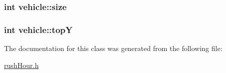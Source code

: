 \hypertarget{classvehicle_ab06480dfddc3c0b8696140fb5c649369}{
\subsubsection[{size}]{\setlength{\rightskip}{0pt plus 5cm}int vehicle\-::size}}\label{classvehicle_ab06480dfddc3c0b8696140fb5c649369}
\hypertarget{classvehicle_a718a7fb37dec5ed7d0fec708027ba296}{
\subsubsection[{top\-Y}]{\setlength{\rightskip}{0pt plus 5cm}int vehicle\-::top\-Y}}\label{classvehicle_a718a7fb37dec5ed7d0fec708027ba296}


The documentation for this class was generated from the following file\-:\begin{DoxyCompactItemize}
\item 
\hyperlink{rush_hour_8h}{rush\-Hour.\-h}\end{DoxyCompactItemize}
